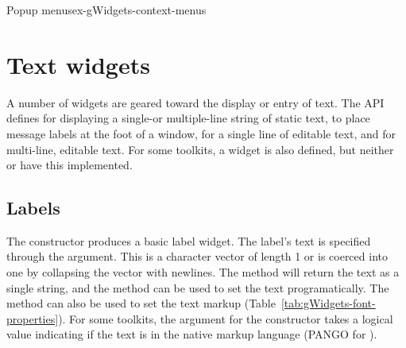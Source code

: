 \begin{example}{Popup menus}{ex-gWidgets-context-menus}
\begin{Schunk}
\end{Schunk}

\end{example}


\section{Text widgets}
\label{sec:text-widgets}

A number of widgets are geared toward the display or entry of
text. The  API defines  for
displaying a single-or multiple-line string of static text,
 to place message labels at the foot of a
window,  for a single line of editable text, and
 for multi-line, editable text. For some toolkits,
a  widget is also defined, but neither 
or  have this implemented.

\subsection{Labels}
\label{sec:gWidgets-static-text}

The  constructor produces a basic label
widget. The label's text is specified through the
 argument. This is a character vector of length
1 or is coerced into one by collapsing the vector with newlines. The
 method will return the text as a single
string, and the  method can be used to
set the text programatically. The  method
can also be used to set the text markup
(Table~\ref{tab:gWidgets-font-properties}).  For some toolkits, the
argument  for the constructor takes a logical
value indicating if the text is in the native markup language (PANGO
for ).


